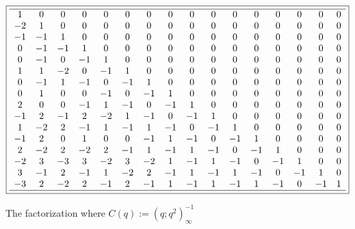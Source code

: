 \documentclass[10pt,reqno]{amsart}
\numberwithin{figure}{section}
\numberwithin{table}{section}
\theoremstyle{plain}
\numberwithin{theorem}{section}
\theoremstyle{remark}
\begin{document}
\begin{figure}[ht!]
\begin{minipage}{\linewidth} 
\begin{center} 
\tiny 
\begin{equation*} 
\boxed{ 
\begin{array}{cccccccccccccccccc} \hline 
 1 & 0 & 0 & 0 & 0 & 0 & 0 & 0 & 0 & 0 & 0 & 0 & 0 & 0 & 0 & 0 \\
 -2 & 1 & 0 & 0 & 0 & 0 & 0 & 0 & 0 & 0 & 0 & 0 & 0 & 0 & 0 & 0 \\
 -1 & -1 & 1 & 0 & 0 & 0 & 0 & 0 & 0 & 0 & 0 & 0 & 0 & 0 & 0 & 0 \\
 0 & -1 & -1 & 1 & 0 & 0 & 0 & 0 & 0 & 0 & 0 & 0 & 0 & 0 & 0 & 0 \\
 0 & -1 & 0 & -1 & 1 & 0 & 0 & 0 & 0 & 0 & 0 & 0 & 0 & 0 & 0 & 0 \\
 1 & 1 & -2 & 0 & -1 & 1 & 0 & 0 & 0 & 0 & 0 & 0 & 0 & 0 & 0 & 0 \\
 0 & -1 & 1 & -1 & 0 & -1 & 1 & 0 & 0 & 0 & 0 & 0 & 0 & 0 & 0 & 0 \\
 0 & 1 & 0 & 0 & -1 & 0 & -1 & 1 & 0 & 0 & 0 & 0 & 0 & 0 & 0 & 0 \\
 2 & 0 & 0 & -1 & 1 & -1 & 0 & -1 & 1 & 0 & 0 & 0 & 0 & 0 & 0 & 0 \\
 -1 & 2 & -1 & 2 & -2 & 1 & -1 & 0 & -1 & 1 & 0 & 0 & 0 & 0 & 0 & 0 \\
 1 & -2 & 2 & -1 & 1 & -1 & 1 & -1 & 0 & -1 & 1 & 0 & 0 & 0 & 0 & 0 \\
 -1 & 2 & 0 & 1 & 0 & 0 & -1 & 1 & -1 & 0 & -1 & 1 & 0 & 0 & 0 & 0 \\
 2 & -2 & 2 & -2 & 2 & -1 & 1 & -1 & 1 & -1 & 0 & -1 & 1 & 0 & 0 & 0 \\
 -2 & 3 & -3 & 3 & -2 & 3 & -2 & 1 & -1 & 1 & -1 & 0 & -1 & 1 & 0 & 0 \\
 3 & -1 & 2 & -1 & 1 & -2 & 2 & -1 & 1 & -1 & 1 & -1 & 0 & -1 & 1 & 0 \\
 -3 & 2 & -2 & 2 & -1 & 2 & -1 & 1 & -1 & 1 & -1 & 1 & -1 & 0 & -1 & 1 \\
 \hline 
\end{array}
} 
\end{equation*} 
\end{center} 
\end{minipage}

\caption{The factorization where $C(q) := (q; q^2)_{\infty}^{-1}$} 
\label{figure_factpair_v4} 

\end{figure} 
\end{document}

